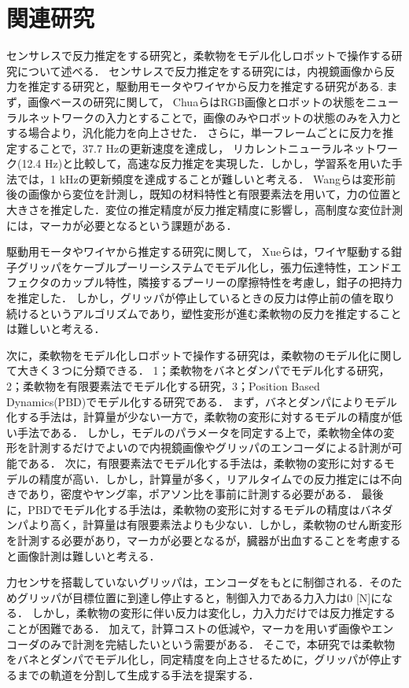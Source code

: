 \documentclass[a4paper]{jarticle}
\begin{document}
\section{関連研究}
センサレスで反力推定をする研究と，柔軟物をモデル化しロボットで操作する研究について述べる．
センサレスで反力推定をする研究には，内視鏡画像から反力を推定する研究と，駆動用モータやワイヤから反力を推定する研究がある.
まず，画像ベースの研究に関して，
ChuaらはRGB画像とロボットの状態をニューラルネットワークの入力とすることで，画像のみやロボットの状態のみを入力とする場合より，汎化能力を向上させた\cite{ref_Chua}．
さらに，単一フレームごとに反力を推定することで，37.7 Hzの更新速度を達成し，
リカレントニューラルネットワーク(12.4 Hz)と比較して，高速な反力推定を実現した．しかし，学習系を用いた手法では，1 kHzの更新頻度を達成することが難しいと考える．
Wangらは変形前後の画像から変位を計測し，既知の材料特性と有限要素法を用いて，力の位置と大きさを推定した\cite{ref_Wang}．変位の推定精度が反力推定精度に影響し，高制度な変位計測には，マーカが必要となるという課題がある．

駆動用モータやワイヤから推定する研究に関して，
Xueらは，ワイヤ駆動する鉗子グリッパをケーブルプーリーシステムでモデル化し，張力伝達特性，エンドエフェクタのカップル特性，隣接するプーリーの摩擦特性を考慮し，鉗子の把持力を推定した\cite{ref_Xue}．
しかし，グリッパが停止しているときの反力は停止前の値を取り続けるというアルゴリズムであり，塑性変形が進む柔軟物の反力を推定することは難しいと考える．

次に，柔軟物をモデル化しロボットで操作する研究は，柔軟物のモデル化に関して大きく３つに分類できる\cite{ref_review_modeling}．
1；柔軟物をバネとダンパでモデル化する研究，2；柔軟物を有限要素法でモデル化する研究，3；Position Based Dynamics(PBD)でモデル化する研究である．
まず，バネとダンパによりモデル化する手法は，計算量が少ない一方で，柔軟物の変形に対するモデルの精度が低い手法である\cite{ref_MSD}．
しかし，モデルのパラメータを同定する上で，柔軟物全体の変形を計測するだけでよいので内視鏡画像やグリッパのエンコーダによる計測が可能である．
次に，有限要素法でモデル化する手法は，柔軟物の変形に対するモデルの精度が高い\cite{ref_FEM}．しかし，計算量が多く，リアルタイムでの反力推定には不向きであり，密度やヤング率，ポアソン比を事前に計測する必要がある．
最後に，PBDでモデル化する手法は，柔軟物の変形に対するモデルの精度はバネダンパより高く，計算量は有限要素法よりも少ない\cite{ref_PBD}．しかし，柔軟物のせん断変形を計測する必要があり，マーカが必要となるが，臓器が出血することを考慮すると画像計測は難しいと考える．

力センサを搭載していないグリッパは，エンコーダをもとに制御される．そのためグリッパが目標位置に到達し停止すると，制御入力である力入力は0 [N]になる．
しかし，柔軟物の変形に伴い反力は変化し，力入力だけでは反力推定することが困難である．
加えて，計算コストの低減や，マーカを用いず画像やエンコーダのみで計測を完結したいという需要がある．
そこで，本研究では柔軟物をバネとダンパでモデル化し，同定精度を向上させるために，グリッパが停止するまでの軌道を分割して生成する手法を提案する．
\end{document}
